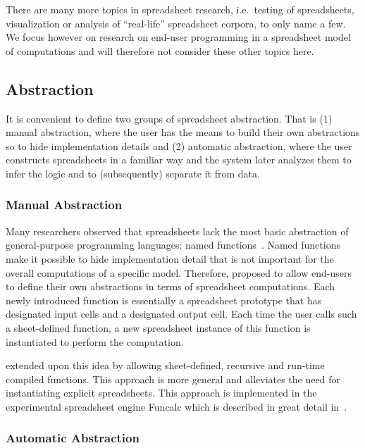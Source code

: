 \documentclass[a4paper]{article}
\begin{document}
There are many more topics in spreadsheet research, i.e.\ testing of spreadsheets, visualization or analysis of ``real-life'' spreadsheet corpora, to only name a few. We focus however on research on end-user programming in a spreadsheet model of computations and will therefore not consider these other topics here.

\subsection{Abstraction}
\label{sec:abstraction}

It is convenient to define two groups of spreadsheet abstraction. That is (1) manual abstraction, where the user has the means to build their own abstractions so to hide implementation details and (2) automatic abstraction, where the user constructs spreadsheets in a familiar way and the system later analyzes them to infer the logic and to (subsequently) separate it from data.

\subsubsection{Manual Abstraction}

Many researchers observed that spreadsheets lack the most basic abstraction of general-purpose programming languages: named functions~\cite{Jones:2003:UAF:944705.944721}. Named functions make it possible to hide implementation detail that is not important for the overall computations of a specific model. Therefore,
\citet{Jones:2003:UAF:944705.944721} proposed to allow end-users to define their own abstractions in terms of spreadsheet computations. Each newly introduced function is essentially a spreadsheet prototype that has designated input cells and a designated output cell. Each time the user calls such a sheet-defined function, a new spreadsheet instance of this function is instantiated to perform the computation.

\citet{Sestoft:2008:IFS:1370847.1370867} extended upon this idea by allowing sheet-defined, recursive and run-time compiled functions. This approach is more general and alleviates the need for instantiating explicit spreadsheets. This approach is implemented in the experimental spreadsheet engine Funcalc which is described in great detail in~\cite{Sestoft2014Spreadsheet}.

\subsubsection{Automatic Abstraction}
\end{document}
